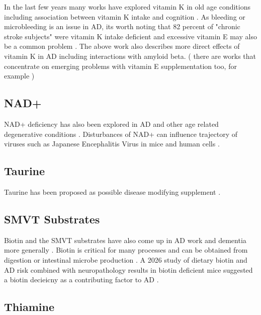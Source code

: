 In the last few years many works have explored vitamin K in old
age conditions
\cite{Emekli-Alturfan2023}
\cite{PMC11676630}
including association between vitamin K intake and cognition
\cite{Booth_Shea_Barger_Association_vitamin_2022}.
As bleeding or microbleeding is an issue in AD, its worth noting
that 82 percent of "chronic stroke subjects" were vitamin K intake
deficient and excessive vitamin E may also be a common problem 
\cite{Grimaldi_Cavallaro_Angelis_Vitamin_Properties_2025}.
The above work also describes more direct effects of vitamin K
in AD including interactions with amyloid beta. 
( there are works that concentrate on emerging problems with 
vitamin E supplementation too, for example 
\cite{Kaye_Thomassen_Mashaw_Vitamin_upalpha_Tocopherol_2025}
)


\subsection{NAD+ }
NAD+ deficiency has also been explored in AD
\cite{PMC8449423}
and other age related degenerative conditions
\cite{PMC6787556}.
Disturbances of NAD+ can influence trajectory of
viruses such as Japanese Encephalitis Virus in mice and human cells
\cite{PMID41693302}.
\subsection{Taurine }
Taurine has been proposed as possible disease modifying
supplement
\cite{PMID41752008}.

\subsection{SMVT Substrates }
Biotin and the SMVT substrates
\cite{Sang_Philbert_Hartland_Coenzyme_Dependent_Tricarboxylic_2022}
 have also come up in AD work
and dementia more generally
\cite{Scholefield_Church_Xu_Localized_Pantothenic_Acid_Vitamin_2024}
\cite{Cooper_P3400_Biotin_deficiency_2008}
.
Biotin is critical for many processes and can be obtained from
digestion or intestinal microbe production
\cite{Karachaliou_Livaniou_Biotin_Homeostasis_Human_2024}.
A 2026 study of dietary biotin and AD risk combined with
neuropathology results in biotin deficient mice
suggested a biotin decieicny as a contributing factor to AD
\cite{PMID41679193}.

\subsection{Thiamine }

